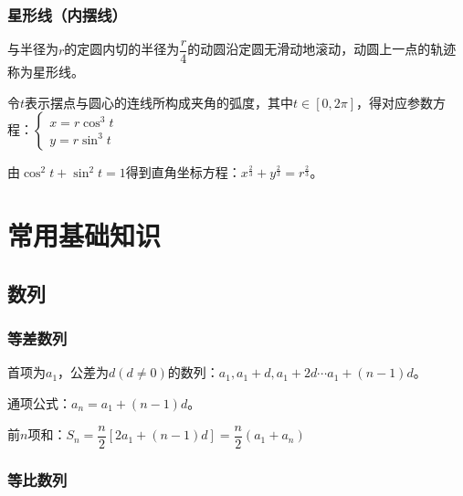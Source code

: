 \documentclass[UTF8, 12pt]{ctexart}
\begin{document}
\subsubsection{星形线（内摆线）}

\begin{minipage}{0.5\linewidth}
    与半径为$r$的定圆内切的半径为$\dfrac{r}{4}$的动圆沿定圆无滑动地滚动，动圆上一点的轨迹称为星形线。

    令$t$表示摆点与圆心的连线所构成夹角的弧度，其中$t\in[0,2\pi]$，得对应参数方程：$
    \left\{
    \begin{array}{lcl}
        x=r\cos^3t \\
        y=r\sin^3t
    \end{array}
    \right.
    $

    由$\cos^2t+\sin^2t=1$得到直角坐标方程：$x^{\frac{2}{3}}+y^{\frac{2}{3}}=r^{\frac{2}{3}}$。
\end{minipage}
\hfill
\begin{minipage}{0.4\linewidth}
\end{minipage}

\section{常用基础知识}
\subsection{数列}
\subsubsection{等差数列}

首项为$a_1$，公差为$d(d\neq 0)$的数列：$a_1,a_1+d,a_1+2d\cdots a_1+(n-1)d$。

通项公式：$a_n=a_1+(n-1)d$。

前$n$项和：$S_n=\dfrac{n}{2}[2a_1+(n-1)d]=\dfrac{n}{2}(a_1+a_n)$

\subsubsection{等比数列}
\end{document}
